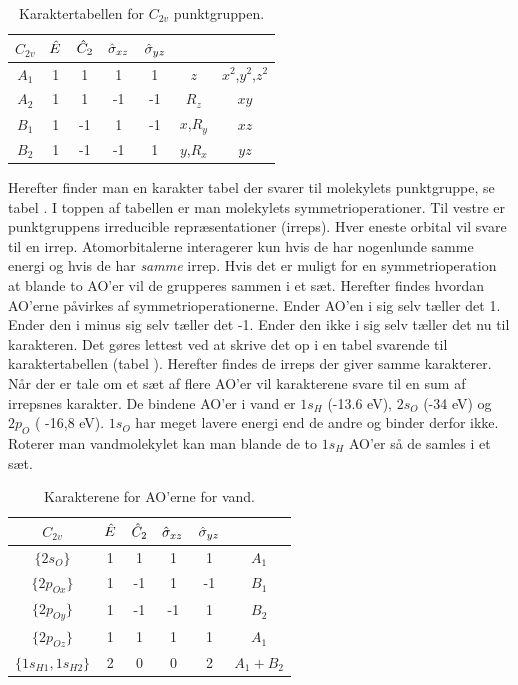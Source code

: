 \documentclass[../main.tex]{subfiles}
\begin{document}
\begin{table}[h]
    \centering
    \begin{tabular}{c|c c c c c c}
$C_{2v}$ & $\hat E$ & $\hat C_2$ & $\hat \sigma_{xz}$ & $\hat \sigma_{yz}$\\\hline
$A_1$ & 1&1&1&1 & $z$ & $x^2$,$y^2$,$z^2$\\
$A_2$ & 1&1&-1&-1&$R_z$& $xy$\\
$B_1$ & 1 & -1&1&-1&$x$,$R_y$&$xz$\\
$B_2$ & 1&-1&-1&1&$y$,$R_x$ & $yz$
    \end{tabular}
    \caption{Karaktertabellen for $C_{2v}$ punktgruppen.}
    \label{tab:amo:C2v}
\end{table}
Herefter finder man en karakter tabel der svarer til molekylets punktgruppe, se tabel . 
I toppen af tabellen er man molekylets symmetrioperationer. Til vestre er punktgruppens irreducible repræsentationer (irreps). Hver eneste orbital vil svare til en irrep. Atomorbitalerne interagerer kun hvis de har nogenlunde samme energi og hvis de har {\em samme} irrep. Hvis det er muligt for en symmetrioperation at blande to AO'er vil de grupperes sammen i et sæt. Herefter findes hvordan AO'erne påvirkes af symmetrioperationerne. Ender AO'en i sig selv tæller det 1. Ender den i minus sig selv tæller det -1. Ender den ikke i sig selv tæller det nu til karakteren. Det gøres lettest ved at skrive det op i en tabel svarende til karaktertabellen (tabel ). Herefter findes de irreps der giver samme karakterer. Når der er tale om et sæt af flere AO'er vil karakterene svare til en sum af irrepsnes karakter. De bindene AO'er i vand er $1s_H$ (-13.6 eV), $2s_O$ (-34 eV) og $2p_O$ ( -16,8 eV). $1s_O$ har meget lavere energi end de andre og binder derfor ikke.
Roterer man vandmolekylet kan man blande de to $1s_H$ AO'er så de samles i et sæt.
\begin{table}[h]
    \centering
    \begin{tabular}{c|c c c c c}
$C_{2v}$ & $\hat E$ & $\hat C_2$ & $\hat \sigma_{xz}$ & $\hat \sigma_{yz}$\\\hline
$\{2s_O\}$ & 1 & 1 & 1 & 1 & $A_1$\\
$\{2p_{Ox}\}$ & 1 & -1 & 1 & -1 & $B_1$\\
$\{2p_{Oy}\}$ & 1 & -1 & -1 & 1 & $B_2$\\
$\{2p_{Oz}\}$ & 1 & 1 & 1 & 1 & $A_1$\\
$\{1s_{H1},1s_{H2}\}$ & 2 & 0 & 0 & 2 & $A_1+B_2$
    \end{tabular}
    \caption{Karakterene for AO'erne for vand.}
    \label{tab:amo:MOvand}
\end{table}
\end{document}
